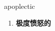 
\begin{frame}
{\huge apoplectic}
\begin{center}
\begin{enumerate}\Large
  \item \textbf{极度愤怒的}
\end{enumerate}
\end{center}
\end{frame}
